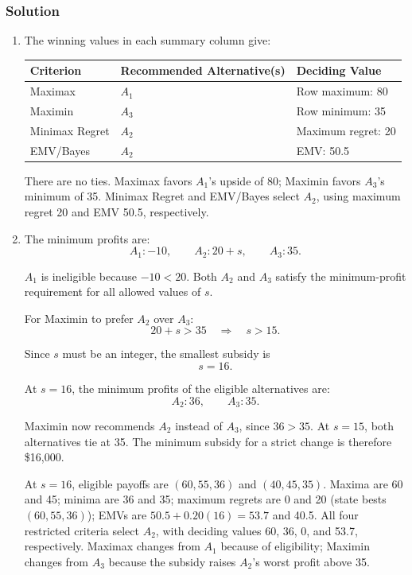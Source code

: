 \subsubsection*{Solution}
\label{subsec:c8-farm-solution}

\begin{enumerate}
	\item The winning values in each summary column give:
	
	\begin{center}
		\begin{tabular}{lll}\toprule
			Criterion & Recommended Alternative(s) & Deciding Value\\\midrule
			Maximax & $A_1$ & Row maximum: 80\\
			Maximin & $A_3$ & Row minimum: 35\\
			Minimax Regret & $A_2$ & Maximum regret: 20\\
			EMV/Bayes & $A_2$ & EMV: 50.5\\\bottomrule
		\end{tabular}
	\end{center}
	
	There are no ties. Maximax favors $A_1$'s upside of 80; Maximin favors $A_3$'s minimum of 35. Minimax Regret and EMV/Bayes select $A_2$, using maximum regret 20 and EMV 50.5, respectively.
	
	\item The minimum profits are:
	\[
	A_1:-10,\qquad A_2:20+s,\qquad A_3:35.
	\]
	
	$A_1$ is ineligible because $-10<20$. Both $A_2$ and $A_3$ satisfy the minimum-profit requirement for all allowed values of $s$.
	
	For Maximin to prefer $A_2$ over $A_3$:
	\[
	20+s>35
	\quad\Longrightarrow\quad
	s>15.
	\]
	
	Since $s$ must be an integer, the smallest subsidy is
	\[
	\boxed{s=16}.
	\]
	
	At $s=16$, the minimum profits of the eligible alternatives are:
	\[
	A_2:36,\qquad A_3:35.
	\]
	
	Maximin now recommends $A_2$ instead of $A_3$, since $36>35$. At $s=15$, both alternatives tie at 35. The minimum subsidy for a strict change is therefore \$16,000.

At $s=16$, eligible payoffs are $(60,55,36)$ and $(40,45,35)$. Maxima are 60 and 45; minima are 36 and 35; maximum regrets are 0 and 20 (state bests $(60,55,36)$); EMVs are $50.5+0.20(16)=53.7$ and 40.5. All four restricted criteria select $A_2$, with deciding values 60, 36, 0, and 53.7, respectively. Maximax changes from $A_1$ because of eligibility; Maximin changes from $A_3$ because the subsidy raises $A_2$'s worst profit above 35.


\end{enumerate}

